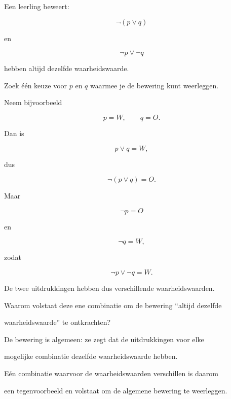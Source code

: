 \documentclass{ximera}
\begin{document}
\begin{oefening}{\oefG}

Een leerling beweert:

\[
\neg(p\lor q)
\]

en

\[
\neg p\lor\neg q
\]

hebben altijd dezelfde waarheidswaarde.

\begin{question}

Zoek één keuze voor $p$ en $q$ waarmee je de bewering kunt weerleggen.

\begin{oplossing}

Neem bijvoorbeeld

\[
p=W,
\qquad
q=O.
\]

Dan is

\[
p\lor q=W,
\]

dus

\[
\neg(p\lor q)=O.
\]

Maar

\[
\neg p=O
\]

en

\[
\neg q=W,
\]

zodat

\[
\neg p\lor\neg q=W.
\]

De twee uitdrukkingen hebben dus verschillende waarheidswaarden.

\end{oplossing}

\end{question}



\begin{question}

Waarom volstaat deze ene combinatie om de bewering ``altijd dezelfde

waarheidswaarde'' te ontkrachten?

\begin{oplossing}

De bewering is algemeen: ze zegt dat de uitdrukkingen voor elke

mogelijke combinatie dezelfde waarheidswaarde hebben.

Eén combinatie waarvoor de waarheidswaarden verschillen is daarom

een tegenvoorbeeld en volstaat om de algemene bewering te weerleggen.

\end{oplossing}


\end{question}
\end{oefening}
\end{document}
